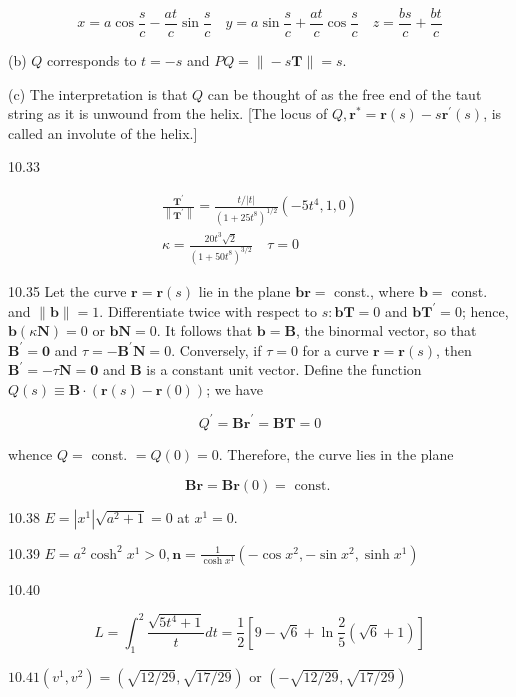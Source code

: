 \documentclass[10pt]{article}
\begin{document}
$$
x=a \cos \frac{s}{c}-\frac{a t}{c} \sin \frac{s}{c} \quad y=a \sin \frac{s}{c}+\frac{a t}{c} \cos \frac{s}{c} \quad z=\frac{b s}{c}+\frac{b t}{c}
$$

(b) $Q$ corresponds to $t=-s$ and $P Q=\|-s \mathbf{T}\|=s$.

(c) The interpretation is that $Q$ can be thought of as the free end of the taut string as it is unwound from the helix. [The locus of $Q, \mathbf{r}^{*}=\mathbf{r}(s)-s \mathbf{r}^{\prime}(s)$, is called an involute of the helix.]

10.33

$$
\begin{gathered}
\frac{\mathbf{T}^{\prime}}{\left\|\mathbf{T}^{\prime}\right\|}=\frac{t /|t|}{\left(1+25 t^{8}\right)^{1 / 2}}\left(-5 t^{4}, 1,0\right) \\
\kappa=\frac{20 t^{3} \sqrt{2}}{\left(1+50 t^{8}\right)^{3 / 2}} \quad \tau=0
\end{gathered}
$$

10.35 Let the curve $\mathbf{r}=\mathbf{r}(s)$ lie in the plane $\mathbf{b r}=$ const., where $\mathbf{b}=$ const. and $\|\mathbf{b}\|=1$. Differentiate twice with respect to $s: \mathbf{b T}=0$ and $\mathbf{b T}^{\prime}=0$; hence, $\mathbf{b}(\kappa \mathbf{N})=0$ or $\mathbf{b N}=0$. It follows that $\mathbf{b}=\mathbf{B}$, the binormal vector, so that $\mathbf{B}^{\prime}=\mathbf{0}$ and $\tau=-\mathbf{B}^{\prime} \mathbf{N}=0$. Conversely, if $\tau=0$ for a curve $\mathbf{r}=\mathbf{r}(s)$, then $\mathbf{B}^{\prime}=-\tau \mathbf{N}=\mathbf{0}$ and $\mathbf{B}$ is a constant unit vector. Define the function $Q(s) \equiv \mathbf{B} \cdot(\mathbf{r}(s)-\mathbf{r}(0))$; we have

$$
Q^{\prime}=\mathbf{B r}^{\prime}=\mathbf{B} \mathbf{T}=0
$$

whence $Q=$ const. $=Q(0)=0$. Therefore, the curve lies in the plane

$$
\mathbf{B r}=\mathbf{B r}(0)=\text { const. }
$$

10.38 $E=\left|x^{1}\right| \sqrt{a^{2}+1}=0$ at $x^{1}=0$.

10.39 $E=a^{2} \cosh ^{2} x^{1}>0, \mathbf{n}=\frac{1}{\cosh x^{1}}\left(-\cos x^{2},-\sin x^{2}, \sinh x^{1}\right)$

10.40

$$
L=\int_{1}^{2} \frac{\sqrt{5 t^{4}+1}}{t} d t=\frac{1}{2}\left[9-\sqrt{6}+\ln \frac{2}{5}(\sqrt{6}+1)\right]
$$

$10.41\left(v^{1}, v^{2}\right)=(\sqrt{12 / 29}, \sqrt{17 / 29})$ or $(-\sqrt{12 / 29}, \sqrt{17 / 29})$
\end{document}
